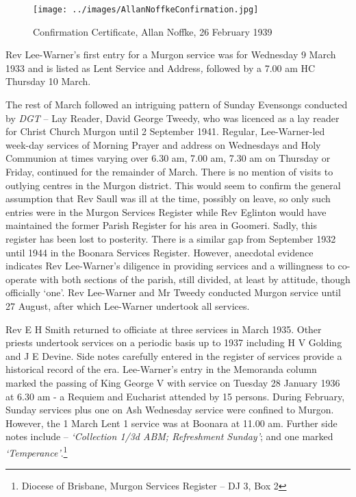 \medskip








\begin{figure}[!htb]
\begin{center}
\texttt{[image: ../images/AllanNoffkeConfirmation.jpg]}
\caption{Confirmation Certificate, Allan Noffke, 26 February 1939}
\end{center}
\end{figure}




Rev Lee-Warner's first entry for a Murgon service was for Wednesday 9 March 1933 and is listed as Lent Service and Address\emph{,} followed by a 7.00 am HC Thursday 10 March.



The rest of March followed an intriguing pattern of Sunday Evensongs conducted by \emph{DGT} -- Lay Reader, David George Tweedy, who was licenced as a lay reader for Christ Church Murgon until 2 September 1941. Regular, Lee-Warner-led week-day services of Morning Prayer and address on Wednesdays and Holy Communion at times varying over 6.30 am, 7.00 am, 7.30 am on Thursday or Friday, continued for the remainder of March. There is no mention of visits to outlying centres in the Murgon district. This would seem to confirm the general assumption that Rev Saull was ill at the time, possibly on leave, so only such entries were in the Murgon Services Register while Rev Eglinton would have maintained the former Parish Register for his area in Goomeri. Sadly, this register has been lost to posterity. There is a similar gap from September 1932 until 1944 in the Boonara Services Register. However, anecdotal evidence indicates Rev Lee-Warner's diligence in providing services and a willingness to co-operate with both sections of the parish, still divided, at least by attitude, though officially `one'. Rev Lee-Warner and Mr Tweedy conducted Murgon service until 27 August, after which Lee-Warner undertook all services.



Rev E H Smith returned to officiate at three services in March 1935. Other priests undertook services on a periodic basis up to 1937 including H V Golding and J E Devine. Side notes carefully entered in the register of services provide a historical record of the era. Lee-Warner's entry in the Memoranda column marked the passing of King George V with service on Tuesday 28 January 1936 at 6.30 am - a Requiem and Eucharist attended by 15 persons. During February, Sunday services plus one on Ash Wednesday service were confined to Murgon. However, the 1 March Lent 1 service was at Boonara at 11.00 am. Further side notes include -- \emph{`Collection 1/3d ABM; Refreshment Sunday'}; and one marked \emph{`Temperance'}.\footnote{Diocese of Brisbane, Murgon Services Register -- DJ 3, Box 2}


